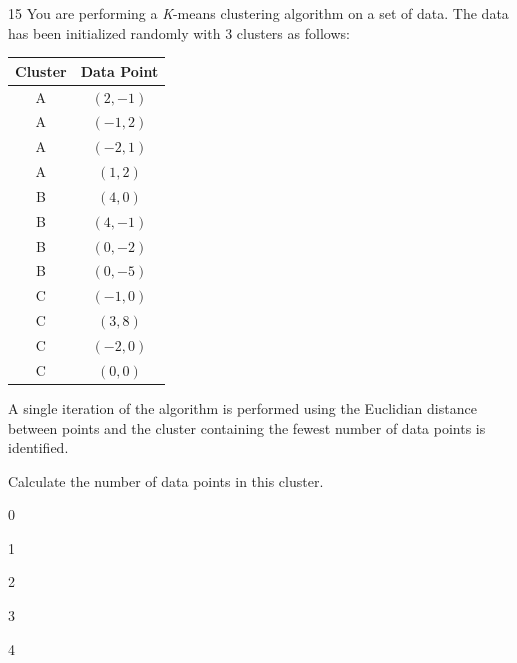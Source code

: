 \begin{question}{15}
You are performing a \textit{K}-means clustering algorithm on a set of data. The data has been initialized randomly with 3 clusters as follows:
\begin{center}
\begin{tabular}{|c|c|}
\hline
Cluster & Data Point \\ \hline
A & $(2, -1)$ \\ \hline
A & $(-1, 2)$ \\ \hline
A & $(-2, 1)$ \\ \hline
A & $(1, 2)$ \\ \hline
B & $(4, 0)$ \\ \hline
B & $(4, -1)$ \\ \hline
B & $(0, -2)$ \\ \hline
B & $(0, -5)$ \\ \hline
C & $(-1, 0)$ \\ \hline
C & $(3, 8)$ \\ \hline
C & $(-2, 0)$ \\ \hline
C & $(0, 0)$ \\ \hline
\end{tabular}
\end{center}

A single iteration of the algorithm is performed using the Euclidian distance between points and the cluster containing the fewest number of data points is identified.

Calculate the number of data points in this cluster.

\begin{choices}
\item 0
\item 1
\item 2
\item 3
\item 4
\end{choices}
\end{question}
